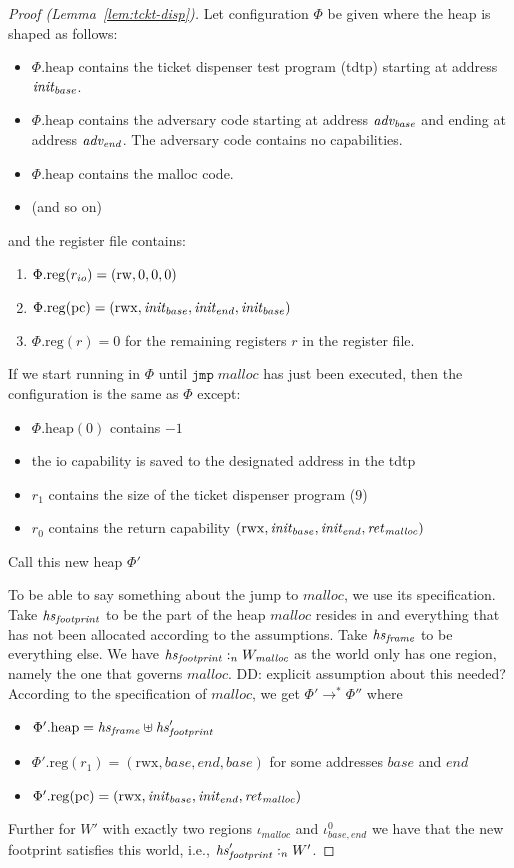 \documentclass{article}
\newcommand\dominique[1]{{\color{purple} \sf \footnotesize {DD: #1}}\\}
\newcommand{\var}[1]{\mathit{#1}}
\newcommand{\pcreg}{\mathrm{pc}}
\newcommand{\heap}{\var{heap}}
\newcommand{\plainproj}[1]{\mathrm{#1}}
\newcommand{\memheap}[1][\Phi]{#1.\plainproj{heap}}
\newcommand{\memreg}[1][\Phi]{#1.\plainproj{reg}}
\newcommand{\heapSat}[3][\heap]{#1 :_{#2} #3}
\newcommand{\codelabel}[1]{\mathit{#1}}
\newcommand{\malloc}{\codelabel{malloc}}
\newcommand{\zinstr}[1]{\mathtt{#1}}
\newcommand{\oneinstr}[2]{\zinstr{#1} \; #2}
\newcommand{\jmp}[1]{\oneinstr{jmp}{#1}}
\newcommand{\plainperm}[1]{\mathrm{#1}}
\newcommand{\readwrite}{\plainperm{rw}}
\newcommand{\rwx}{\plainperm{rwx}}
\newcommand{\step}[1][]{\rightarrow_{#1}}
\begin{document}
 \begin{proof}[Proof (Lemma~\ref{lem:tckt-disp})]
Let configuration $\Phi$ be given where the heap is shaped as follows:
\begin{itemize}
\item $\memheap$ contains the ticket dispenser test program (tdtp) starting at address $\initb$.
\item $\memheap$ contains the adversary code starting at address $\advb$ and ending at address $\adve$. The adversary code contains no capabilities.
\item $\memheap$ contains the malloc code.
\item (and so on) %
\end{itemize}
and the register file contains:
\begin{enumerate}
\item $\memreg(\rio) = (\readwrite,0,0,0)$ 
\item $\memreg(\pcreg) = (\rwx,\initb, \inite, \initb)$
\item $\memreg(r) = 0$ for the remaining registers $r$ in the register file.
\end{enumerate}

If we start running in $\Phi$ until $\jmp{\malloc}$ has just been executed, then the configuration is the same as $\Phi$ except:
\begin{itemize}
\item $\memheap(0)$ contains $-1$
\item the io capability is saved to the designated address in the tdtp
\item $r_1$ contains the size of the ticket dispenser program (9)
\item $r_0$ contains the return capability $(\rwx,\initb,\inite, \retm)$
\end{itemize}
Call this new heap $\Phi'$

To be able to say something about the jump to $\malloc$, we use its specification. Take $\hsfoot$ to be the part of the heap $\malloc$ resides in and everything that has not been allocated according to the assumptions. Take $\hsframe$ to be everything else. We have $\heapSat[\hsfoot]{n}{W_\var{\malloc}}$ as the world only has one region, namely the one that governs $\malloc$.\dominique{explicit assumption about this needed?} According to the specification of $\malloc$, we get $\Phi' \step^* \Phi''$ where
\begin{itemize}
\item $\memheap[\Phi'] = \hsframe \uplus \hsfoot'$
\item $\memreg[\Phi'](r_1) = (\rwx,\var{base},\var{end},\var{base})$ for some addresses $\var{base}$ and $\var{end}$
\item $\memreg[\Phi'](\pcreg) = (\rwx,\initb,\inite,\retm)$
\end{itemize}
Further for $W'$ with exactly two regions $\iota_\malloc$ and $\iota_{\var{base},\var{end}}^0$ we have that the new footprint satisfies this world, i.e., $\heapSat[\hsfoot']{n}{W'}$.


\end{proof}
\end{document}
